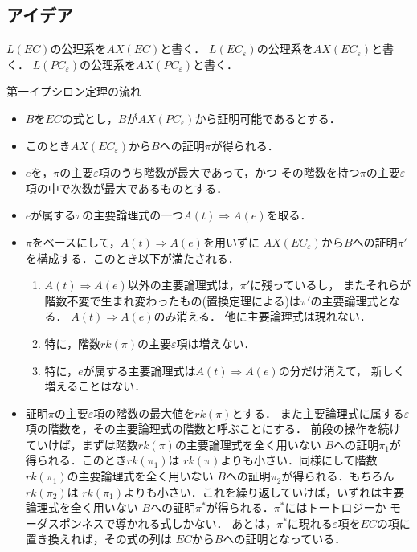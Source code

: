 \subsection{アイデア}
	$L(EC)$の公理系を$AX(EC)$と書く．
	$L(EC_{\varepsilon})$の公理系を$AX(EC_{\varepsilon})$と書く．
	$L(PC_{\varepsilon})$の公理系を$AX(PC_{\varepsilon})$と書く．
	
	\begin{itembox}[l]{第一イプシロン定理の流れ}
		\begin{itemize}
			\item $B$を$EC$の式とし，$B$が$AX(PC_{\varepsilon})$から証明可能であるとする．
			\item このとき$AX(EC_{\varepsilon})から$$B$への証明$\pi$が得られる．
			\item $e$を，$\pi$の主要$\varepsilon$項のうち階数が最大であって，かつ
				その階数を持つ$\pi$の主要$\varepsilon$項の中で次数が最大であるものとする．
			\item $e$が属する$\pi$の主要論理式の一つ$A(t) \Longrightarrow A(e)$を取る．
			\item $\pi$をベースにして，$A(t) \Longrightarrow A(e)$を用いずに
				$AX(EC_{\varepsilon})$から$B$への証明$\pi'$を構成する．このとき以下が満たされる．
				\begin{enumerate}
					\item $A(t) \Longrightarrow A(e)$以外の主要論理式は，$\pi'$に残っているし，
						またそれらが階数不変で生まれ変わったもの(置換定理による)は$\pi'$の主要論理式となる．
						$A(t) \Longrightarrow A(e)$のみ消える．
						他に主要論理式は現れない．
					
					\item 特に，階数$rk(\pi)$の主要$\varepsilon$項は増えない．
						
					\item 特に，$e$が属する主要論理式は$A(t) \Longrightarrow A(e)$の分だけ消えて，
						新しく増えることはない．
				\end{enumerate}
				
			\item 証明$\pi$の主要$\varepsilon$項の階数の最大値を$rk(\pi)$とする．
				また主要論理式に属する$\varepsilon$項の階数を，その主要論理式の階数と呼ぶことにする．
				前段の操作を続けていけば，まずは階数$rk(\pi)$の主要論理式を全く用いない
				$B$への証明$\pi_{1}$が得られる．このとき$rk(\pi_{1})$は
				$rk(\pi)$よりも小さい．同様にして階数$rk(\pi_{1})$の主要論理式を全く用いない
				$B$への証明$\pi_{2}$が得られる．もちろん$rk(\pi_{2})$は
				$rk(\pi_{1})$よりも小さい．これを繰り返していけば，いずれは主要論理式を全く用いない
				$B$への証明$\pi^{\ast}$が得られる．$\pi^{\ast}$にはトートロジーか
				モーダスポンネスで導かれる式しかない．
				あとは，$\pi^{\ast}$に現れる$\varepsilon$項を$EC$の項に置き換えれば，その式の列は
				$EC$から$B$への証明となっている．
		\end{itemize}
	\end{itembox}
	
